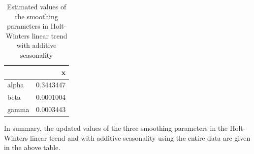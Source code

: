 \documentclass[
]{book}
\begin{document}
\begin{table}

\caption{\label{tab:unnamed-chunk-253}Estimated values of the smoothing parameters in
      Holt-Winters linear trend with additive seasonality}
\centering
\begin{tabular}[t]{l|r}
\hline
  & x\\
\hline
alpha & 0.3443447\\
\hline
beta & 0.0001004\\
\hline
gamma & 0.0003443\\
\hline
\end{tabular}
\end{table}

In summary, the updated values of the three smoothing parameters in the Holt-Winters linear trend and with additive seasonality using the entire data are given in the above table.

\hfill\break

\hfill\break

  
\end{document}
